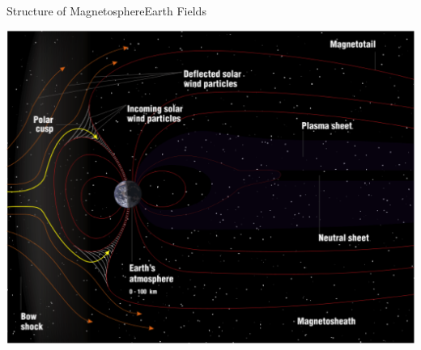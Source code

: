 \documentclass{beamer}
\begin{document}


%
%



\begin{frame}{Structure of Magnetosphere}{Earth Fields}
	\begin{center}
		\includegraphics[height=0.85 \textheight]{magsphere.png}
	\end{center}
\end{frame}
\end{document}
